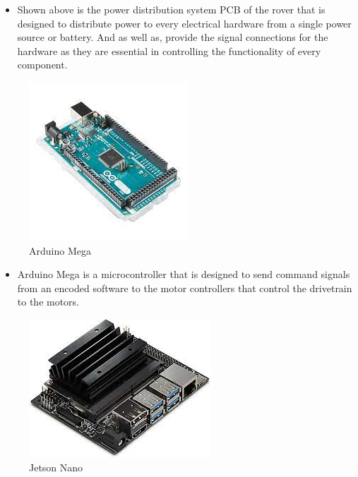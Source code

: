 \documentclass[a4paper, 10pt]{article}
\begin{document}
\begin{itemize}
\item
	Shown above is the power distribution system PCB of the rover that is designed to distribute power to every electrical hardware from a single power source or battery. And as well as, provide the signal connections for the hardware as they are essential in controlling the functionality of every component. 
\end{itemize}

\begin{figure} [h]
			\centering
			\includegraphics[scale=0.3]{Photos/Arduino Mega}
			\caption{Arduino Mega}
		\end{figure}


\begin{itemize}
\item
	Arduino Mega is a microcontroller that is designed to send command signals from an encoded software to the motor controllers that control the drivetrain to the motors.
\end{itemize}


\begin{figure} [!h]
			\centering
			\includegraphics[scale=0.25]{Photos/Jetson Nano}
			\caption{Jetson Nano}
		\end{figure}

\end{document}
